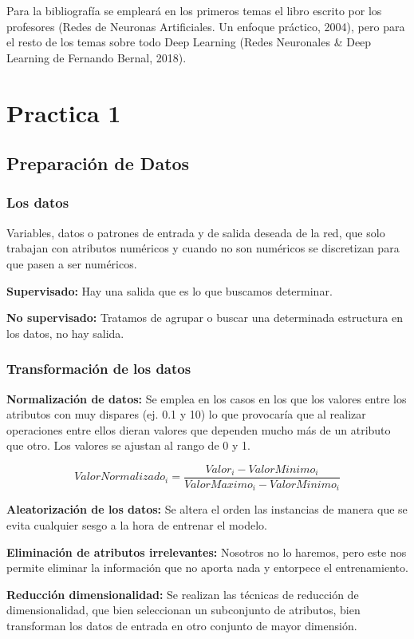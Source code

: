 \documentclass[12pt, twoside, openright]{report} %
\begin{document}
Para la bibliografía se empleará en los primeros temas el libro escrito por los profesores (Redes de Neuronas Artificiales. Un enfoque práctico, 2004), pero para el resto de los temas sobre todo Deep Learning (Redes Neuronales \& Deep Learning de Fernando Bernal, 2018).

\chapter{Practica 1}
\section{Preparación de Datos}
\subsection{Los datos}
Variables, datos o patrones de entrada y de salida deseada de la red, que solo trabajan con atributos numéricos y cuando no son numéricos se discretizan para que pasen a ser numéricos.

\textbf{Supervisado:} Hay una salida que es lo que buscamos determinar.

\textbf{No supervisado:} Tratamos de agrupar o buscar una determinada estructura en los datos, no hay salida.

\subsection{Transformación de los datos}
\textbf{Normalización de datos:} Se emplea en los casos en los que los valores entre los atributos con muy dispares (ej. 0.1 y 10) lo que provocaría que al realizar operaciones entre ellos dieran valores que dependen mucho más de un atributo que otro. Los valores se ajustan al rango de 0 y 1.

$$ValorNormalizado_i=\frac {Valor_i-ValorMinimo_i} {ValorMaximo_i-ValorMinimo_i}$$

\textbf{Aleatorización de los datos:} Se altera el orden las instancias de manera que se evita cualquier sesgo a la hora de entrenar el modelo.

\textbf{Eliminación de  atributos irrelevantes:} Nosotros no lo haremos, pero este nos permite eliminar la información que no aporta nada y entorpece el entrenamiento.

\textbf{Reducción dimensionalidad:} Se realizan las técnicas de reducción de dimensionalidad, que bien seleccionan un subconjunto de atributos, bien transforman los datos de entrada en otro conjunto de mayor dimensión.
\end{document}
